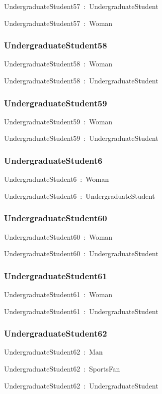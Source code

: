 \documentclass{article}
\begin{document}
UndergraduateStudent57~:~UndergraduateStudent

UndergraduateStudent57~:~Woman

\subsubsection*{UndergraduateStudent58}

UndergraduateStudent58~:~Woman

UndergraduateStudent58~:~UndergraduateStudent

\subsubsection*{UndergraduateStudent59}

UndergraduateStudent59~:~Woman

UndergraduateStudent59~:~UndergraduateStudent

\subsubsection*{UndergraduateStudent6}

UndergraduateStudent6~:~Woman

UndergraduateStudent6~:~UndergraduateStudent

\subsubsection*{UndergraduateStudent60}

UndergraduateStudent60~:~Woman

UndergraduateStudent60~:~UndergraduateStudent

\subsubsection*{UndergraduateStudent61}

UndergraduateStudent61~:~Woman

UndergraduateStudent61~:~UndergraduateStudent

\subsubsection*{UndergraduateStudent62}

UndergraduateStudent62~:~Man

UndergraduateStudent62~:~SportsFan

UndergraduateStudent62~:~UndergraduateStudent
\end{document}
